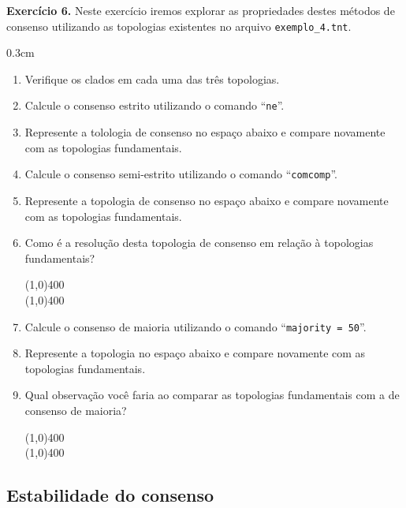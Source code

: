 \begin{refsection}
\begin{blackBlock}{\textbf{Exercício 6.}}
Neste exercício iremos explorar as propriedades destes métodos de consenso utilizando as topologias existentes no arquivo \texttt{exemplo\_4.tnt}.

\end{blackBlock}


\begin {myindentpar}{0.3cm}
\begin{enumerate}[\itshape i.]
	\item{Verifique os clados em cada uma das três topologias.}
	\item{Calcule o consenso estrito utilizando o comando ``\texttt{ne}''.}
	\item{Represente a tolologia de consenso no espaço abaixo e compare novamente com as topologias fundamentais.}

\vspace{100pt}

	\item{Calcule o consenso semi-estrito utilizando o comando ``\texttt{comcomp}''.}
	\item{Represente a topologia de consenso no espaço abaixo e compare novamente com as topologias fundamentais.}

\vspace{100pt}

	\item{Como é a resolução desta topologia de consenso em relação à topologias fundamentais?}

	\line(1,0){400}\\
	\line(1,0){400}\\

	\item{Calcule o consenso de maioria utilizando o comando ``\texttt{majority = 50}''.}
	\item{Represente a topologia no espaço abaixo e compare novamente com as topologias fundamentais.}

\vspace{100pt}

	\item{Qual observação você faria ao comparar as topologias fundamentais com a de consenso de maioria?}

	\line(1,0){400}\\
	\line(1,0){400}\\


\end{enumerate}
\end{myindentpar}


\subsection{Estabilidade do consenso}\label{tut6:consenso:stability}


\end{refsection}
